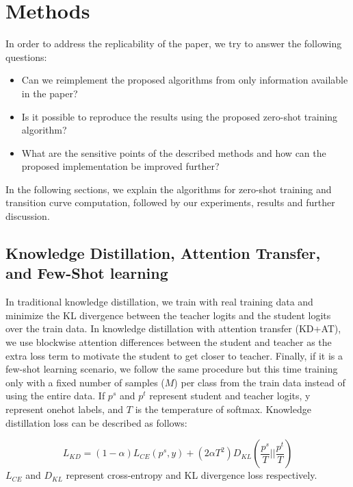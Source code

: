 \documentclass{article}
\begin{document}
\section{Methods}\label{methods}

In order to address the replicability of the paper, we try to answer the following questions:

\begin{itemize}
    \item Can we reimplement the proposed algorithms from only information available in the paper?
    \item Is it possible to reproduce the results using the proposed zero-shot training algorithm?
    \item What are the sensitive points of the described methods and how can the proposed implementation be improved further?

\end{itemize}  In the following sections, we explain the algorithms for zero-shot training and transition curve computation, followed by our experiments, results and further discussion.
\subsection{Knowledge Distillation, Attention Transfer, and Few-Shot learning}

In traditional knowledge distillation, we train with real training data and minimize the KL divergence between the teacher logits and the student logits over the train data. In knowledge distillation with attention transfer (KD+AT), we use blockwise attention differences between the student and teacher as the extra loss term \cite{zagoruyko2016paying} to motivate the student to get closer to teacher. Finally, if it is a few-shot learning scenario, we follow the same procedure but this time training only with a fixed number of samples ($M$) per class from the train data instead of using the entire data. If $p^s$ and $p^t$ represent student and teacher logits, y represent onehot labels, and $T$ is the temperature of softmax. Knowledge distillation loss can be described as follows:

\begin{equation}
    L_{KD}=(1-\alpha)L_{CE}(p^s, y)+(2 \alpha T^2)D_{KL}(\frac{p^s}{T} || \frac{p^t}{T})
\end{equation}
$L_{CE}$ and $D_{KL}$ represent cross-entropy and KL divergence loss respectively.

\end{document}
